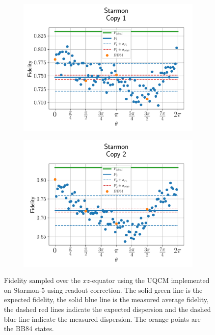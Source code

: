 \begin{figure}[H]
    \centering
    \begin{subfigure}{.45\textwidth}
      \centering
      \includegraphics[width=\textwidth]{Figures/UQCM/Starmon/OnlyEquator/results_corrected_starmon5_copy1.png}
    \end{subfigure}%
    \begin{subfigure}{.45\textwidth}
      \centering
      \includegraphics[width=\textwidth]{Figures/UQCM/Starmon/OnlyEquator/results_corrected_starmon5_copy2.png}
    \end{subfigure}
    \caption{Fidelity sampled over the $xz$-equator using the UQCM implemented on Starmon-5 using readout correction. The solid green line is the expected fidelity, the solid blue line is the measured average fidelity, the dashed red lines indicate the expected dispersion and the dashed blue line indicate the measured dispersion. The orange points are the BB84 states.}
    \label{fig:uqcm_eq_starmon}
\end{figure}


